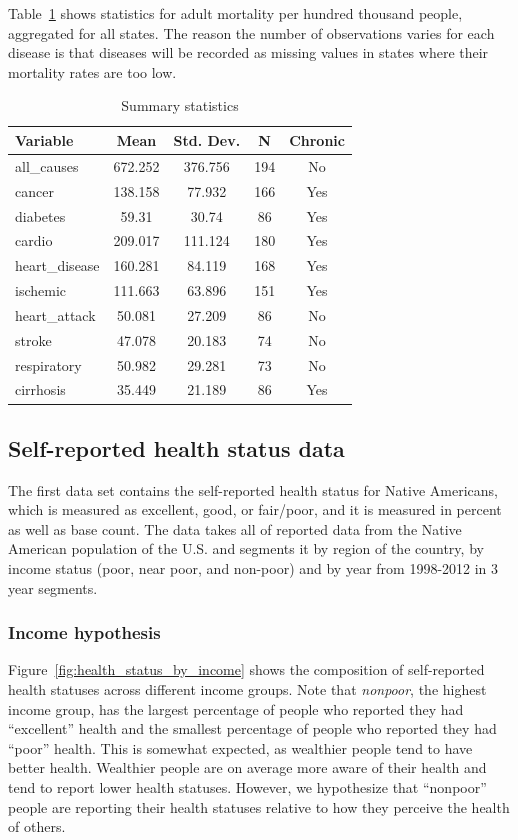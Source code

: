 \documentclass[12pt]{article}
\begin{document}
Table~\ref{sumstat} shows statistics for adult mortality per hundred thousand people, aggregated for all states.
The reason the number of observations varies for each disease is that diseases will be recorded as missing values in states where their mortality rates are too low.

\begin{table}[htbp]\centering \caption{Summary statistics \label{sumstat}}
\begin{tabular}{l c c  c c}\hline\hline
\textbf{Variable} & \textbf{Mean} & \textbf{Std. Dev.} & \textbf{N} & \textbf{Chronic} \\\hline
all\_causes & 672.252 & 376.756  & 194 & No\\
cancer & 138.158 & 77.932  & 166 & Yes\\
diabetes & 59.31 & 30.74  & 86 & Yes\\
cardio & 209.017 & 111.124  & 180 & Yes\\
heart\_disease & 160.281 & 84.119  & 168 & Yes\\
ischemic & 111.663 & 63.896  & 151 & Yes\\
heart\_attack & 50.081 & 27.209  & 86 & No\\
stroke & 47.078 & 20.183  & 74 & No\\
respiratory & 50.982 & 29.281  & 73 & No\\
cirrhosis & 35.449 & 21.189  & 86 & Yes\\
\hline
\end{tabular}
\end{table}



\subsection{Self-reported health status data}
The first data set contains the self-reported health status for Native Americans, which is measured as excellent, good, or fair/poor, and it is measured in percent as well as base count.
The data takes all of reported data from the Native American population of the U.S. and segments it by region of the country, by income status (poor, near poor, and non-poor) and by year from 1998-2012 in 3 year segments.

\subsubsection{Income hypothesis}
Figure~\ref{fig:health_status_by_income} shows the composition of self-reported health statuses across different income groups. Note that \emph{nonpoor}, the highest income group, has the largest percentage of people who reported they had ``excellent'' health and the smallest percentage of people who reported they had ``poor'' health. 
This is somewhat expected, as wealthier people tend to have better health. 
Wealthier people are on average more aware of their health and tend to report lower health statuses. 
However, we hypothesize that ``nonpoor'' people are reporting their health statuses relative to how they perceive the health of others. 
\end{document}
